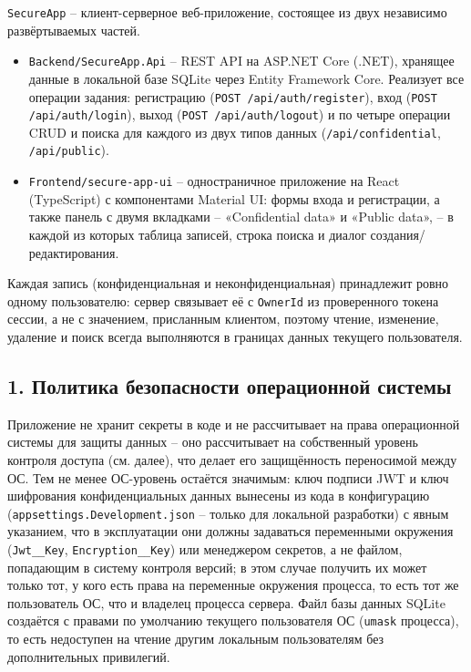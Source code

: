 

\texttt{SecureApp} -- клиент-серверное веб-приложение, состоящее из двух
независимо развёртываемых частей.

\begin{itemize}
  \item \texttt{Backend/SecureApp.Api} -- REST API на ASP.NET Core (.NET),
  хранящее данные в локальной базе SQLite через Entity Framework Core.
  Реализует все операции задания: регистрацию (\texttt{POST
  /api/auth/register}), вход (\texttt{POST /api/auth/login}), выход
  (\texttt{POST /api/auth/logout}) и по четыре операции CRUD и поиска для
  каждого из двух типов данных (\texttt{/api/confidential},
  \texttt{/api/public}).
  \item \texttt{Frontend/secure-app-ui} -- одностраничное приложение на
  React (TypeScript) с компонентами Material UI: формы входа и
  регистрации, а также панель с двумя вкладками -- «Confidential data» и
  «Public data», -- в каждой из которых таблица записей, строка поиска и
  диалог создания/редактирования.
\end{itemize}

Каждая запись (конфиденциальная и неконфиденциальная) принадлежит ровно
одному пользователю: сервер связывает её с \texttt{OwnerId} из проверенного
токена сессии, а не с значением, присланным клиентом, поэтому чтение,
изменение, удаление и поиск всегда выполняются в границах данных текущего
пользователя.


\subsection*{1. Политика безопасности операционной системы}

Приложение не хранит секреты в коде и не рассчитывает на права
операционной системы для защиты данных -- оно рассчитывает на собственный
уровень контроля доступа (см. далее), что делает его защищённость
переносимой между ОС. Тем не менее ОС-уровень остаётся значимым: ключ
подписи JWT и ключ шифрования конфиденциальных данных вынесены из кода в
конфигурацию (\texttt{appsettings.Development.json} -- только для
локальной разработки) с явным указанием, что в эксплуатации они должны
задаваться переменными окружения (\texttt{Jwt\_\_Key},
\texttt{Encryption\_\_Key}) или менеджером секретов, а не файлом,
попадающим в систему контроля версий; в этом случае получить их может
только тот, у кого есть права на переменные окружения процесса, то есть
тот же пользователь ОС, что и владелец процесса сервера. Файл базы данных
SQLite создаётся с правами по умолчанию текущего пользователя ОС
(\texttt{umask} процесса), то есть недоступен на чтение другим локальным
пользователям без дополнительных привилегий.

